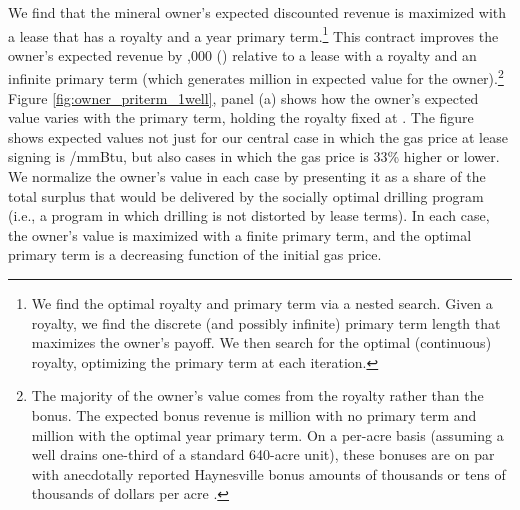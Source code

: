 \documentclass[12pt]{article}
\begin{document}
We find that the mineral owner's expected discounted revenue is maximized with a lease that has a royalty and a year primary term.\footnote{We find the optimal royalty and primary term via a nested search. Given a royalty, we find the discrete (and possibly infinite) primary term length that maximizes the owner's payoff. We then search for the optimal (continuous) royalty, optimizing the primary term at each iteration.} This contract improves the owner's expected revenue by \unskip ,000 (\unskip) relative to a lease with a royalty and an infinite primary term (which generates million in expected value for the owner).\footnote{The majority of the owner's value comes from the royalty rather than the bonus. The expected bonus revenue is million with no primary term and million with the optimal year primary term. On a per-acre basis (assuming a well drains one-third of a standard 640-acre unit), these bonuses are on par with anecdotally reported Haynesville bonus amounts of thousands or tens of thousands of dollars per acre \citep{bib:bogan}.} Figure \ref{fig:owner_priterm_1well}, panel (a) shows how the owner's expected value varies with the primary term, holding the royalty fixed at \unskip. The figure shows expected values not just for our central case in which the gas price at lease signing is \unskip /mmBtu, but also cases in which the gas price is 33\% higher or lower. We normalize the owner's value in each case by presenting it as a share of the total surplus that would be delivered by the socially optimal drilling program (i.e., a program in which drilling is not distorted by lease terms). In each case, the owner's value is maximized with a finite primary term, and the optimal primary term is a decreasing function of the initial gas price. 
\end{document}
